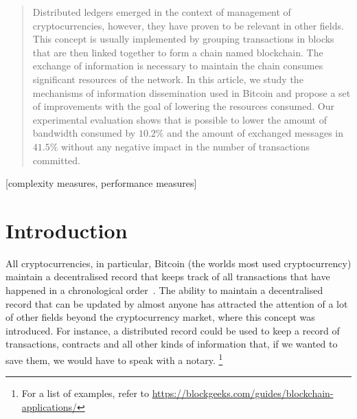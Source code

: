 \documentclass{dads}   %
\begin{document}
\date{30 July 1999}

\maketitle
\begin{abstract}
Distributed ledgers emerged in the context of management of cryptocurrencies, however, they have proven to be relevant in other fields. This concept is usually implemented by grouping transactions in blocks that are then linked together to form a chain named blockchain. The exchange of information is necessary to maintain the chain consumes significant resources of the network. In this article, we study the mechanisms of information dissemination used in Bitcoin and propose a set of improvements with the goal of lowering the resources consumed. Our experimental evaluation shows that is possible to lower the amount of bandwidth consumed by $10.2\%$ and the amount of exchanged messages in $41.5\%$ without any negative impact in the number of transactions committed.
\end{abstract}

[complexity measures, performance measures]



\section{Introduction}
All cryptocurrencies, in particular, Bitcoin (the worlds most used cryptocurrency) maintain a decentralised record that keeps track of all transactions that have happened in a chronological order~\cite{nakamoto2008bitcoin}. The ability to maintain a decentralised record that can be updated by almost anyone has attracted the attention of a lot of other fields beyond the cryptocurrency market, where this concept was introduced. For instance, a distributed record could be used to keep a record of transactions, contracts and all other kinds of information that, if we wanted to save them, we would have to speak with a notary. \footnote{For a list of examples, refer to \url{https://blockgeeks.com/guides/blockchain-applications/}}
\end{document}
